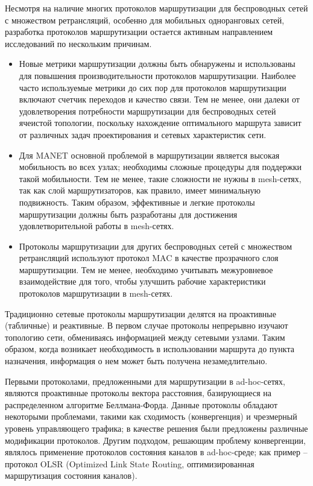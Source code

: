 \documentclass[14pt,a4paper,titlepage]{extarticle}
\begin{document}
Несмотря на наличие многих протоколов маршрутизации для беспроводных сетей с множеством ретрансляций, особенно для мобильных одноранговых сетей, разработка протоколов маршрутизации остается активным направлением исследований по нескольким причинам.
\begin{itemize}
\item Новые метрики маршрутизации должны быть обнаружены и использованы для повышения производительности протоколов маршрутизации. Наиболее часто используемые метрики до сих пор для протоколов маршрутизации включают счетчик переходов и качество связи. Тем не менее, они далеки от удовлетворения потребности маршрутизации для беспроводных сетей ячеистой топологии, поскольку нахождение оптимального маршрута зависит от различных задач проектирования и сетевых характеристик сети.
\item Для MANET основной проблемой в маршрутизации является высокая мобильность во всех узлах; необходимы сложные процедуры для поддержки такой мобильности. Тем не менее, такие сложности не нужны в mesh-сетях, так как слой маршрутизаторов, как правило, имеет минимальную подвижность. Таким образом, эффективные и легкие протоколы маршрутизации должны быть разработаны для достижения удовлетворительной работы в mesh-сетях.
\item Протоколы маршрутизации для других беспроводных сетей с множеством ретрансляций используют протокол MAC в качестве прозрачного слоя маршрутизации. Тем не менее, необходимо учитывать межуровневое взаимодействие  для того, чтобы улучшить рабочие характеристики протоколов маршрутизации в mesh-сетях.
\end{itemize}

Традиционно сетевые протоколы маршрутизации делятся на проактивные (табличные) и реактивные. В первом случае протоколы непрерывно изучают топологию сети, обмениваясь информацией между сетевыми узлами. Таким образом, когда возникает необходимость в использовании маршрута до пункта назначения, информация о нем может быть получена незамедлительно. 

Первыми протоколами, предложенными для маршрутизации в ad-hoc-сетях, являются проактивные протоколы вектора расстояния, базирующиеся на распределенном алгоритме Беллмана-Форда. Данные протоколы обладают некоторыми проблемами, такими как сходимость (конвергенция) и чрезмерный уровень управляющего трафика; в качестве решения были предложены различные модификации протоколов. Другим подходом, решающим проблему конвергенции, являлось применение протоколов состояния каналов в ad-hoc-среде; как пример -- протокол OLSR (Optimized Link State Routing, оптимизированная маршрутизация состояния каналов).
\end{document}
